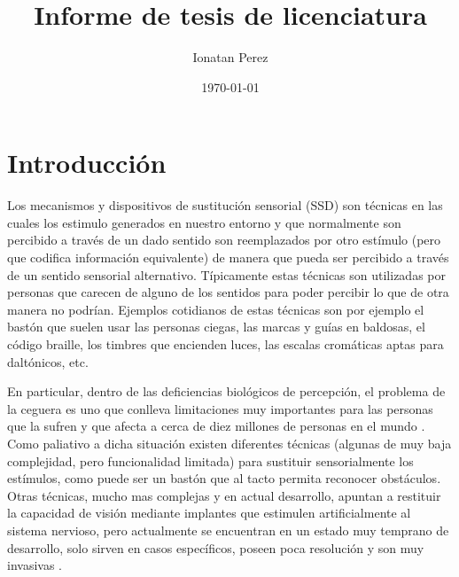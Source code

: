 \documentclass{article}
\title{Informe de tesis de licenciatura}
\author{Ionatan Perez}
\date{\today}
\begin{document}



\renewcommand{\lstlistingname}{Código}




\maketitle

\clearpage 

\tableofcontents  %
\clearpage

\section{Introducción}

    Los mecanismos y dispositivos de sustitución sensorial (SSD) son técnicas en las cuales los estimulo generados en nuestro entorno y que normalmente son percibido a través de un dado sentido son reemplazados por otro estímulo (pero que codifica información equivalente) de manera que pueda ser percibido a través de un sentido sensorial alternativo. Típicamente estas técnicas son utilizadas por personas que carecen de alguno de los sentidos para poder percibir lo que de otra manera no podrían. Ejemplos cotidianos de estas técnicas son por ejemplo el bastón que suelen usar las personas ciegas, las marcas y guías en baldosas, el código braille, los timbres que encienden luces, las escalas cromáticas aptas para daltónicos, etc. 
    
    En particular, dentro de las deficiencias biológicos de percepción, el problema de la ceguera es uno que conlleva limitaciones muy importantes para las personas que la sufren y que afecta a cerca de diez millones de personas en el mundo \cite{NroCiegos}. Como paliativo a dicha situación existen diferentes técnicas (algunas de muy baja complejidad, pero funcionalidad limitada) para sustituir sensorialmente los estímulos, como puede ser un bastón que al tacto permita reconocer obstáculos. Otras técnicas, mucho mas complejas y en actual desarrollo, apuntan a restituir la capacidad de visión mediante implantes que estimulen artificialmente al sistema nervioso\cite{Implantes1,Implantes2}, pero actualmente se encuentran en un estado muy temprano de desarrollo, solo sirven en casos específicos, poseen poca resolución y son muy invasivas \cite{Implantes3,Implantes4}. 
    
\end{document}
